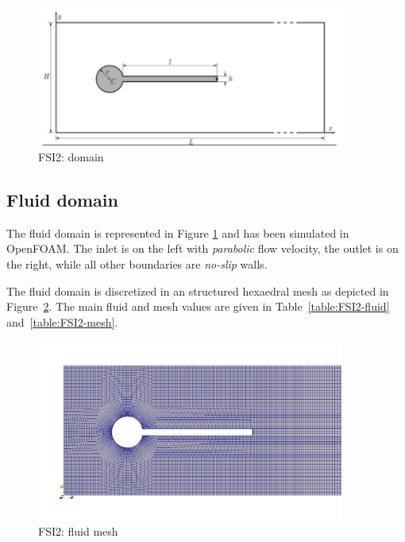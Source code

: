 \begin{figure}[htbp!]
	\centering
	\includegraphics[width=0.92\textwidth, trim=0 0 50 0, clip]{images/FSI2/FSI2.png}
	\caption{FSI2: domain}
	\label{fig:fsi2_domain}
\end{figure}

\subsection{Fluid domain}

The fluid domain is represented in Figure \ref{fig:fsi2_domain} and has been simulated in OpenFOAM. The inlet is on the left with \textit{parabolic} flow velocity, the outlet is on the right, while all other boundaries are \textit{no-slip} walls.

The fluid domain is discretized in an structured hexaedral mesh as depicted in Figure~\ref{fig:FSI2_mesh}. The main fluid and mesh values are given in Table~\ref{table:FSI2-fluid} and~\ref{table:FSI2-mesh}. 

\begin{figure}[htbp!]
	\centering
	\includegraphics[width=0.9\textwidth]{images/FSI2/FSI2-mesh.png}
	\caption{FSI2: fluid mesh}
	\label{fig:FSI2_mesh}
\end{figure}


